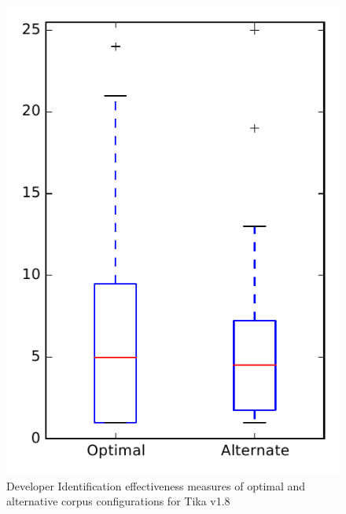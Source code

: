 
\begin{figure}
\centering
\includegraphics[height=0.4\textheight]{figures/combo/dit_rq2_tika}
\caption{Developer Identification effectiveness measures of optimal and alternative corpus configurations for Tika v1.8}
\label{fig:combo:dit:rq2:tika}
\end{figure}

